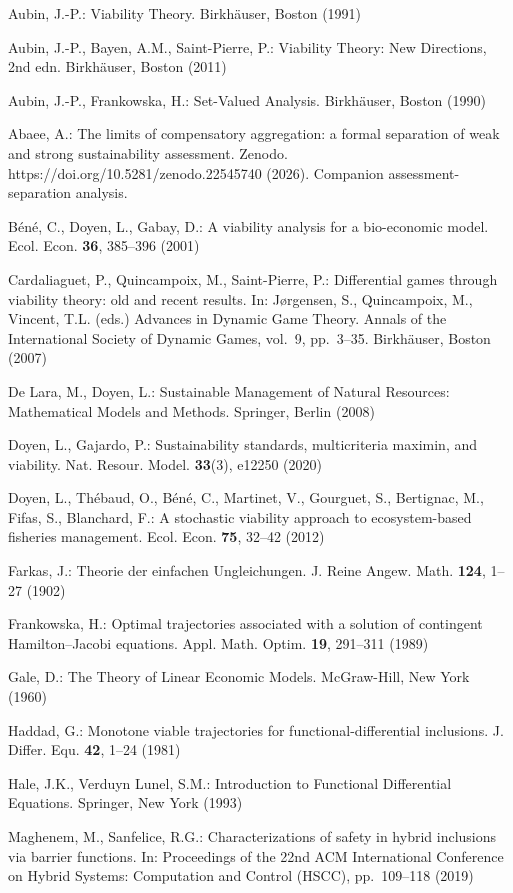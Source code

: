 \documentclass[11pt]{article}
\begin{document}
Aubin, J.-P.: Viability Theory. Birkh\"auser, Boston (1991)

Aubin, J.-P., Bayen, A.M., Saint-Pierre, P.: Viability Theory: New
Directions, 2nd edn. Birkh\"auser, Boston (2011)

Aubin, J.-P., Frankowska, H.: Set-Valued Analysis. Birkh\"auser, Boston
(1990)

Abaee, A.: The limits of compensatory aggregation: a formal separation
of weak and strong sustainability assessment. Zenodo.
https://doi.org/10.5281/zenodo.22545740 (2026). Companion
assessment-separation analysis.

B\'en\'e, C., Doyen, L., Gabay, D.: A viability analysis for a bio-economic
model. Ecol. Econ. \textbf{36}, 385--396 (2001)

Cardaliaguet, P., Quincampoix, M., Saint-Pierre, P.: Differential games
through viability theory: old and recent results. In: J\o{}rgensen, S.,
Quincampoix, M., Vincent, T.L. (eds.) Advances in Dynamic Game Theory.
Annals of the International Society of Dynamic Games, vol.~9, pp.~3--35.
Birkh\"auser, Boston (2007)

De Lara, M., Doyen, L.: Sustainable Management of Natural Resources:
Mathematical Models and Methods. Springer, Berlin (2008)

Doyen, L., Gajardo, P.: Sustainability standards, multicriteria maximin,
and viability. Nat. Resour. Model. \textbf{33}(3), e12250 (2020)

Doyen, L., Th\'ebaud, O., B\'en\'e, C., Martinet, V., Gourguet, S., Bertignac,
M., Fifas, S., Blanchard, F.: A stochastic viability approach to
ecosystem-based fisheries management. Ecol. Econ. \textbf{75}, 32--42
(2012)

Farkas, J.: Theorie der einfachen Ungleichungen. J. Reine Angew. Math.
\textbf{124}, 1--27 (1902)

Frankowska, H.: Optimal trajectories associated with a solution of
contingent Hamilton--Jacobi equations. Appl. Math. Optim. \textbf{19},
291--311 (1989)

Gale, D.: The Theory of Linear Economic Models. McGraw-Hill, New York
(1960)

Haddad, G.: Monotone viable trajectories for functional-differential
inclusions. J. Differ. Equ. \textbf{42}, 1--24 (1981)

Hale, J.K., Verduyn Lunel, S.M.: Introduction to Functional Differential
Equations. Springer, New York (1993)

Maghenem, M., Sanfelice, R.G.: Characterizations of safety in hybrid
inclusions via barrier functions. In: Proceedings of the 22nd ACM
International Conference on Hybrid Systems: Computation and Control
(HSCC), pp.~109--118 (2019)
\end{document}
